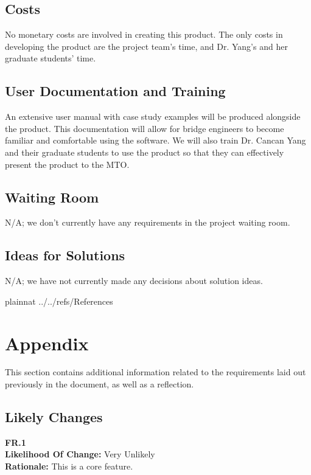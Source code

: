 \documentclass[12pt]{article}
\begin{document}
\subsection{Costs}

No monetary costs are involved in creating this product. The only costs in developing the product are the project team's time, and Dr. Yang's and her graduate students' time.

\subsection{User Documentation and Training}

An extensive user manual with case study examples will be produced alongside the product. This documentation will allow for bridge engineers to become 
familiar and comfortable using the software. We will also train Dr. Cancan Yang and their graduate students to use the product so that they can effectively present the 
product to the MTO.

\subsection{Waiting Room}

N/A; we don't currently have any requirements in the project waiting room.

\subsection{Ideas for Solutions}

N/A; we have not currently made any decisions about solution ideas.

\newpage

 {plainnat}
 {../../refs/References}

\newpage

\section{Appendix}

This section contains additional information related to the requirements laid out previously in the document,
as well as a reflection.

\subsection{Likely Changes}

  \textbf{FR.1}\\  
  \textbf{Likelihood Of Change:} Very Unlikely\\ 
  \textbf{Rationale:} This is a core feature.\\\\
\end{document}
